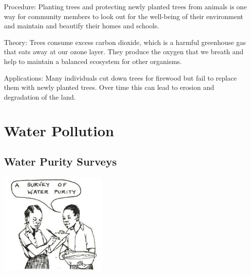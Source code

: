 \begin{multicols}{2}
\begin{description*}
\item[Procedure:]{Planting trees and protecting newly planted trees from animals is one way for community members to look out for the well-being of their environment and maintain and beautify their homes and schools.}
\item[Theory:]{Trees consume excess carbon dioxide, which is a harmful greenhouse gas that eats away at our ozone layer. They produce the oxygen that we breath and help to maintain a balanced ecosystem for other organisms. }
\item[Applications:]{Many individuals cut down trees for firewood but fail to replace them with newly planted trees. Over time this can lead to erosion and degradation of the land.}
\end{description*}

\columnbreak



\section*{Water Pollution} 


\subsection{Water Purity Surveys}

\begin{center}
\includegraphics[width=0.4\textwidth]{./img/source/water-purity.jpg}
\end{center}


\end{multicols}
